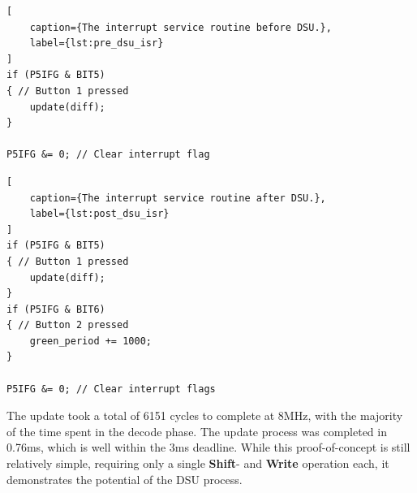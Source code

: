 \noindent\begin{minipage}{.45\textwidth}
\begin{lstlisting}[
    caption={The interrupt service routine before DSU.},
    label={lst:pre_dsu_isr}
]
if (P5IFG & BIT5)
{ // Button 1 pressed
    update(diff);
}

P5IFG &= 0; // Clear interrupt flag
\end{lstlisting}
\end{minipage}\hfill
\noindent\begin{minipage}{.45\textwidth}
\begin{lstlisting}[
    caption={The interrupt service routine after DSU.},
    label={lst:post_dsu_isr}
]
if (P5IFG & BIT5)
{ // Button 1 pressed
    update(diff);
} 
if (P5IFG & BIT6)
{ // Button 2 pressed
    green_period += 1000;
}

P5IFG &= 0; // Clear interrupt flags
\end{lstlisting}
\end{minipage}\hfill
The update took a total of 6151 cycles to complete at 8MHz, with the majority of the time spent in the decode phase. The update process was completed in 0.76ms, which is well within the 3ms deadline. While this proof-of-concept is still relatively simple, requiring only a single \textbf{Shift}- and \textbf{Write} operation each, it demonstrates the potential of the DSU process. 
